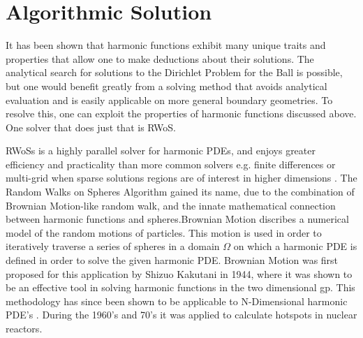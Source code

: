 \section{Algorithmic Solution}
It has been shown that harmonic functions exhibit many unique traits and properties
that allow one to make deductions about their solutions.  The analytical search for solutions to
the Dirichlet Problem for the Ball is possible, but one would benefit greatly
from a solving method that avoids analytical evaluation and is easily applicable on more
general boundary geometries.  To resolve this, one can exploit the properties
of harmonic functions discussed above.  One solver that does just that is \Gls{RWoS}.
\par
 \Glspl{RWoS} is a highly parallel solver for harmonic \Glspl{PDE}, %
and enjoys greater efficiency and practicality than more common solvers e.g.
finite differences or multi-grid when sparse solutions regions are of
interest in higher dimensions \cite{DeLaurentis}\cite{Bornemann}\cite{Yang}.  The Random Walks on Spheres Algorithm
gained its name, due to the combination of Brownian Motion-like random walk, and the innate mathematical connection between
harmonic functions and spheres\cite{Axler1992}.Brownian Motion discribes a numerical model
of the random motions of particles.  This motion is used in order to iteratively traverse a series %
of spheres in a domain $\Omega$ on which a harmonic PDE is defined in order to %
solve the given harmonic PDE\cite{DeLaurentis}.
Brownian Motion
was first
proposed for this application by Shizuo Kakutani in 1944\cite{kakutani},
where it was shown to be an effective tool
in solving harmonic functions in the two dimensional \Gls{gp}.  This methodology has since been
shown to be applicable to N-Dimensional harmonic PDE's \cite{DeLaurentis}.  During the 1960's
and 70's it was applied to calculate hotspots in nuclear reactors\cite{Bornemann}.

